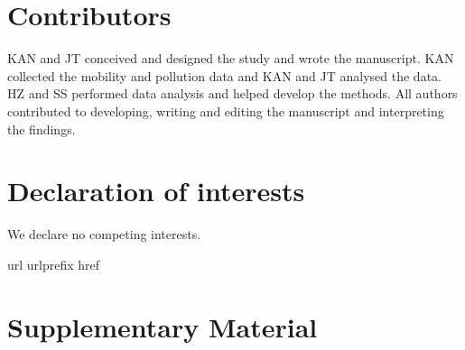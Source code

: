 \documentclass[preprint,10pt]{elsarticle} %
\newcommand{\beginsupplement}{%
        \setcounter{table}{0}
        \renewcommand{\thetable}{S\arabic{table}}%
        \setcounter{figure}{0}
        \renewcommand{\thefigure}{S\arabic{figure}}%
     }
\begin{document}
\section*{Contributors}\label{sec:credit}
KAN and JT conceived and designed the study and wrote the manuscript. KAN collected the mobility and pollution data and KAN and JT analysed the data. HZ and SS performed data analysis and helped develop the methods. All authors contributed to developing, writing and editing the manuscript and interpreting the findings.

\section*{Declaration of interests}\label{sec:dec}
We declare no competing interests.



 
%
\expandafter\ifx\csname url\endcsname\relax
  \def\url#1{\texttt{#1}}\fi
\expandafter\ifx\csname urlprefix\endcsname\relax\def\urlprefix{URL }\fi
\expandafter\ifx\csname href\endcsname\relax
  \def\href#1#2{#2} \def\path#1{#1}\fi



\section{Supplementary Material}
\beginsupplement
\end{document}
